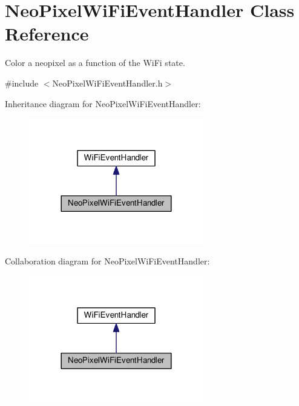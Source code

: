 \hypertarget{class_neo_pixel_wi_fi_event_handler}{}\section{Neo\+Pixel\+Wi\+Fi\+Event\+Handler Class Reference}
\label{class_neo_pixel_wi_fi_event_handler}


Color a neopixel as a function of the Wi\+Fi state.  




{\ttfamily \#include $<$Neo\+Pixel\+Wi\+Fi\+Event\+Handler.\+h$>$}



Inheritance diagram for Neo\+Pixel\+Wi\+Fi\+Event\+Handler\+:\nopagebreak
\begin{figure}[H]
\begin{center}
\leavevmode
\includegraphics[width=216pt]{class_neo_pixel_wi_fi_event_handler__inherit__graph}
\end{center}
\end{figure}


Collaboration diagram for Neo\+Pixel\+Wi\+Fi\+Event\+Handler\+:\nopagebreak
\begin{figure}[H]
\begin{center}
\leavevmode
\includegraphics[width=216pt]{class_neo_pixel_wi_fi_event_handler__coll__graph}
\end{center}
\end{figure}
